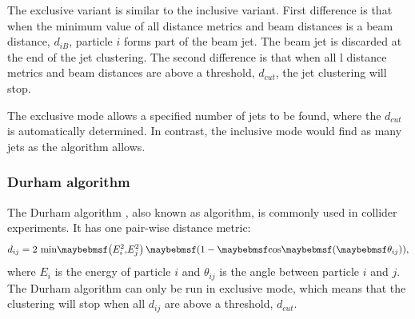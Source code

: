 

The exclusive variant is similar to the inclusive variant. First difference is that when the minimum value of all distance metrics and beam distances  is  a beam distance, $d_{iB}$, particle $i$ forms part of the beam jet. The beam jet is discarded at the end of the jet clustering. The second difference is that when all l distance metrics and beam distances are above a threshold, $d_{cut}$, the jet clustering will stop.

The exclusive mode allows a specified number of jets to be found, where the $d_{cut}$ is automatically determined. In contrast, the inclusive mode would find as many jets as the algorithm allows.


\subsubsection{Durham algorithm}
\label{sec:pandoraJetDurham}
The Durham algorithm \cite{Catani:1991hj}, also known as \ee \kt algorithm, is commonly used in \ee collider experiments. It has one pair-wise distance metric:
\begin{equation}
d_{ij} = 2\,\min\!\parenths{E_i^2,\!E_j^2}\,\parenths{1 - \cosOf{\theta_{ij}}},
\end{equation}
where $E_i$ is the energy of particle $i$ and $\theta_{ij}$ is the angle between particle $i$ and $j$. The Durham algorithm can only be run in exclusive mode, which means that the clustering will stop when all $d_{ij}$ are above a threshold, $d_{cut}$.




